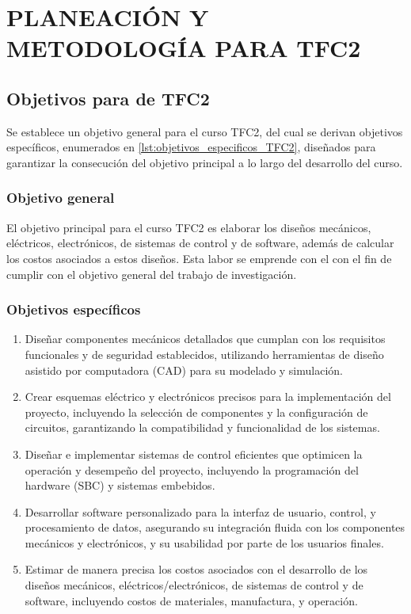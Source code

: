 \chapter*{\MakeUppercase{Planeación y Metodología para TFC2}}
\thispagestyle{mainmatterstyle} %

\section{Objetivos para de TFC2}
Se establece un objetivo general para el curso TFC2, del cual se derivan objetivos específicos, enumerados en \ref{lst:objetivos_especificos_TFC2}, diseñados para garantizar la consecución del objetivo principal a lo largo del desarrollo del curso.

\subsection{Objetivo general}

El objetivo principal para el curso TFC2 es elaborar los diseños mecánicos, eléctricos, electrónicos, de sistemas de control y de software, además de calcular los costos asociados a estos diseños. Esta labor se emprende con el con el fin de cumplir con el objetivo general del trabajo de investigación.

\subsection{Objetivos específicos}

\begin{enumerate}
	\setlength\itemsep{-0.5em}
	\item Diseñar componentes mecánicos detallados que cumplan con los requisitos funcionales y de seguridad establecidos, utilizando herramientas de diseño asistido por computadora (CAD) para su modelado y simulación.
	\item Crear esquemas eléctrico y electrónicos precisos para la implementación del proyecto, incluyendo la selección de componentes y la configuración de circuitos, garantizando la compatibilidad y funcionalidad de los sistemas.
	\item Diseñar e implementar sistemas de control eficientes que optimicen la operación y desempeño del proyecto, incluyendo la programación del hardware (SBC) y sistemas embebidos.
	\item Desarrollar software personalizado para la interfaz de usuario, control, y procesamiento de datos, asegurando su integración fluida con los componentes mecánicos y electrónicos, y su usabilidad por parte de los usuarios finales.
	\item Estimar de manera precisa los costos asociados con el desarrollo de los diseños mecánicos, eléctricos/electrónicos, de sistemas de control y de software, incluyendo costos de materiales, manufactura, y operación.
	\label{lst:objetivos_especificos_TFC2}
\end{enumerate}

